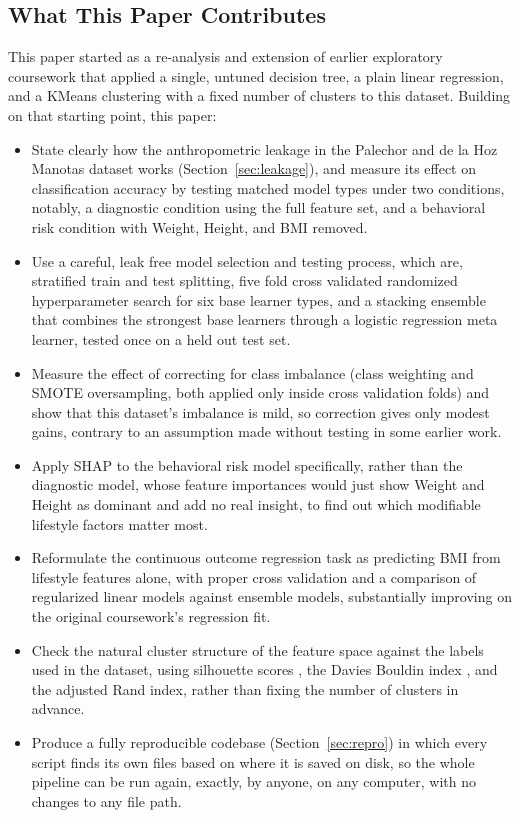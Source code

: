 \documentclass[journal]{IEEEtran}
\begin{document}
\subsection{What This Paper Contributes}
This paper started as a re-analysis and extension of earlier exploratory coursework that applied a single, untuned decision tree, a plain linear regression, and a KMeans clustering with a fixed number of clusters to this dataset. Building on that starting point, this paper:

\begin{itemize}
\item State clearly how the anthropometric leakage in the Palechor and de la Hoz Manotas dataset works (Section~\ref{sec:leakage}), and measure its effect on classification accuracy by testing matched model types under two conditions, notably, a diagnostic condition using the full feature set, and a behavioral risk condition with Weight, Height, and BMI removed.
\item Use a careful, leak free model selection and testing process, which are, stratified train and test splitting, five fold cross validated randomized hyperparameter search for six base learner types, and a stacking ensemble \cite{wolpert1992stacked} that combines the strongest base learners through a logistic regression meta learner, tested once on a held out test set.
\item Measure the effect of correcting for class imbalance (class weighting and SMOTE oversampling, both applied only inside cross validation folds) and show that this dataset's imbalance is mild, so correction gives only modest gains, contrary to an assumption made without testing in some earlier work.
\item Apply SHAP \cite{lundberg2017shap} to the behavioral risk model specifically, rather than the diagnostic model, whose feature importances would just show Weight and Height as dominant and add no real insight, to find out which modifiable lifestyle factors matter most.
\item Reformulate the continuous outcome regression task as predicting BMI from lifestyle features alone, with proper cross validation and a comparison of regularized linear models against ensemble models, substantially improving on the original coursework's regression fit.
\item Check the natural cluster structure of the feature space against the labels used in the dataset, using silhouette scores \cite{rousseeuw1987silhouettes}, the Davies Bouldin index \cite{daviesbouldin1979}, and the adjusted Rand index, rather than fixing the number of clusters in advance.
\item Produce a fully reproducible codebase (Section~\ref{sec:repro}) in which every script finds its own files based on where it is saved on disk, so the whole pipeline can be run again, exactly, by anyone, on any computer, with no changes to any file path.
\end{itemize}
\end{document}
